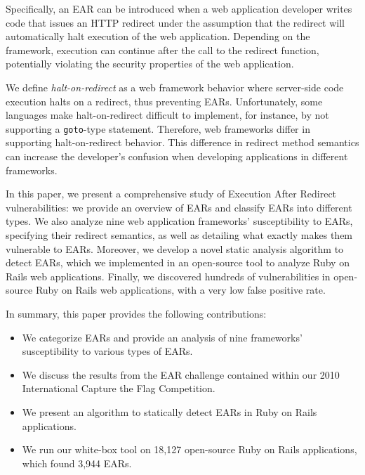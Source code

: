Specifically, an EAR can be introduced when a web application developer
writes code that issues an HTTP redirect under the assumption that the
redirect will automatically halt execution of the web application.
Depending on the framework, execution can continue after the call to the
redirect function, potentially violating the security properties of the web
application.

We define \emph{halt-on-redirect} as a web framework behavior where
server-side code execution halts on a redirect, thus preventing EARs.
Unfortunately, some languages make halt-on-redirect difficult to implement,
for instance, by not supporting a \texttt{goto}-type statement. Therefore,
web frameworks differ in supporting halt-on-redirect behavior. This
difference in redirect method semantics can increase the developer's
confusion when developing applications in different frameworks.

In this paper, we present a comprehensive study of Execution After Redirect
vulnerabilities: we provide an overview of EARs and classify EARs into
different types. We also analyze nine web application frameworks'
susceptibility to EARs, specifying their redirect semantics, as well as
detailing what exactly makes them vulnerable to EARs. Moreover, we develop a
novel static analysis algorithm to detect EARs, which we implemented in an
open-source tool to analyze Ruby on Rails web applications. Finally, we
discovered hundreds of vulnerabilities in open-source Ruby on Rails web
applications, with a very low false positive rate.

In summary, this paper provides the following contributions:

\begin{itemize}

\item We categorize EARs and provide an analysis of nine frameworks'
  susceptibility to various types of EARs.

\item We discuss the results from the EAR challenge contained within our 2010
  International Capture the Flag Competition.

\item We present an algorithm to statically detect EARs in Ruby on
  Rails applications.

\item We run our white-box tool on 18,127 open-source Ruby on
  Rails applications, which found 3,944 EARs.

\end{itemize}

